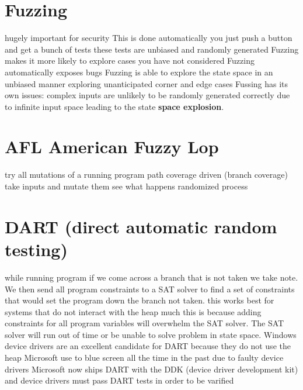 \documentclass[twoside]{article}
\begin{document}
\section{Fuzzing}
hugely important for security
\newline
This is done automatically you just push a button and get a bunch of tests
\newline
these tests are unbiased and randomly generated
\newline
Fuzzing makes it more likely to explore cases you have not considered
\newline
Fuzzing automatically exposes bugs
\newline
Fuzzing is able to explore the state space in an unbiased manner exploring unanticipated corner and edge cases
\newline
Fussing has its own issues: complex inputs are unlikely to be randomly generated correctly due to infinite input space leading to the state \textbf{space explosion}.

\section{AFL American Fuzzy Lop}
try all mutations of a running program path
\newline
coverage driven (branch coverage)
\newline
take inputs and mutate them see what happens
\newline
randomized process

\section{DART (direct automatic random testing)}
while running program if we come across a branch that is not taken we take note. We then send all program constraints to a SAT solver to find a set of constraints that would set the program down the branch not taken. 
\newline
this works best for systems that do not interact with the heap much this is because adding constraints for all program variables will overwhelm the SAT solver. The SAT solver will run out of time or be unable to solve problem in state space.
\newline
Windows device drivers are an excellent candidate for DART because they do not use the heap
\newline
Microsoft use to blue screen all the time in the past due to faulty device drivers
\newline
Microsoft now ships DART with the DDK (device driver development kit) and device drivers must pass DART tests in order to be varified
\end{document}
